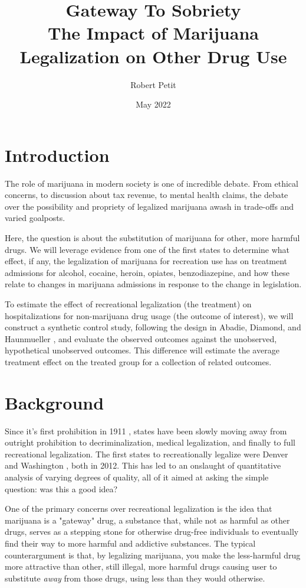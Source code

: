 \documentclass{article}
\title{Gateway To Sobriety \\
    \large The Impact of Marijuana Legalization on Other Drug Use}
\author{Robert Petit}
\date{May 2022}
\begin{document}
\maketitle

\section{Introduction}

The role of marijuana in modern society is one of incredible debate. From ethical concerns, to discussion about tax revenue, to mental health claims, the debate over the possibility and propriety of legalized marijuana awash in trade-offs and varied goalposts.

Here, the question is about the substitution of marijuana for other, more harmful drugs. We will leverage evidence from one of the first states to determine what effect, if any, the legalization of marijuana for recreation use has on treatment admissions for alcohol, cocaine, heroin, opiates, benzodiazepine, and how these relate to changes in marijuana admissions in response to the change in legislation.

To estimate the effect of recreational legalization (the treatment) on hospitalizations for non-marijuana drug usage (the outcome of interest), we will construct a synthetic control study, following the design in Abadie, Diamond, and Haunmueller \citeyearpar{SynthControl}, and evaluate the observed outcomes against the unobserved, hypothetical unobserved outcomes. This difference will estimate the average treatment effect on the treated group for a collection of related outcomes.

\section{Background}


Since it's first prohibition in 1911 \citep{SAGE}, states have been slowly moving away from outright prohibition to decriminalization, medical legalization, and finally to full recreational legalization. The first states to recreationally legalize were Denver and Washington \citep{Reuters}, both in 2012. This has led to an onslaught of quantitative analysis of varying degrees of quality, all of it aimed at asking the simple question: was this a good idea?


One of the primary concerns over recreational legalization is the idea that marijuana is a "gateway" drug, a substance that, while not as harmful as other drugs, serves as a stepping stone for otherwise drug-free individuals to eventually find their way to more harmful and addictive substances. The typical counterargument is that, by legalizing marijuana, you make the less-harmful drug more attractive than other, still illegal, more harmful drugs causing user to substitute \emph{away} from those drugs, using less than they would otherwise.
\end{document}
